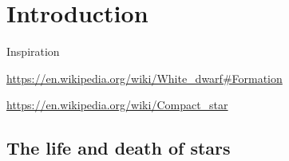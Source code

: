 \setcounter{chapter}{-1} %
\chapter{Introduction}

Inspiration

\url{https://en.wikipedia.org/wiki/White_dwarf#Formation}

\url{https://en.wikipedia.org/wiki/Compact_star}

\section{The life and death of stars}

